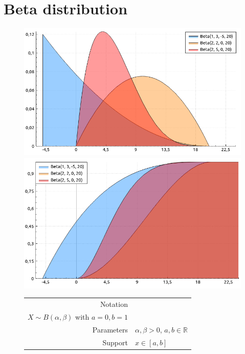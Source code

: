 \documentclass[a4paper,11pt]{article}
\theoremstyle{plain}
\theoremstyle{definition}
\newcommand{\MR}{\mathbb{R}}
\begin{document}
	\section{Beta distribution}
		\begin{figure}[!htb]\centering
			\begin{minipage}{0.55\textwidth}
				\includegraphics[width=\linewidth, right]{beta_pdf}
				\captionsetup{labelformat=empty}
				\includegraphics[width=\linewidth, right]{beta_cdf}
				\captionsetup{labelformat=empty}
			\end{minipage}
			\begin{minipage}{0.4\textwidth}
		\begin{tabular}{| r | l |}
			\hline
			Notation & \pbox{\linewidth}{$ X \sim B(\alpha, \beta, a, b)$ \\ $X \sim B(\alpha, \beta)$ with $a=0, b=1$} \\
			\hline
			Parameters & $\alpha, \beta > 0$, $a, b \in \MR$ \\
			\hline
			Support & $x \in [a, b]$  \\

\end{tabular}
\end{minipage}
\end{figure}
\end{document}
